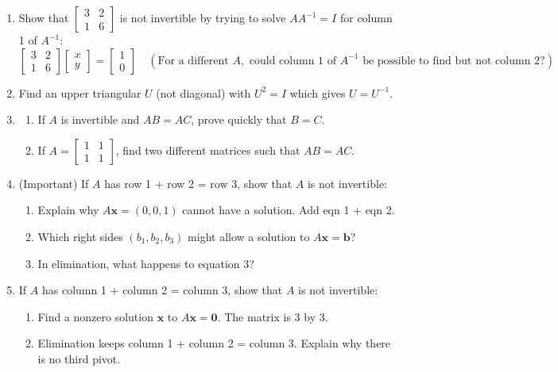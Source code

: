 \documentclass[14pt, a4paper]{article}
\begin{document}
\begin{enumerate}
    \item Show that $\begin{bmatrix} 3 & 2 \\ 1 & 6 \end{bmatrix}$ is not invertible by trying to solve $AA^{-1} = I$ for column 1 of $A^{-1}$:
          \[
              \begin{bmatrix} 3 & 2 \\ 1 & 6 \end{bmatrix}
              \begin{bmatrix} x \\ y \end{bmatrix}
              = \begin{bmatrix} 1 \\ 0 \end{bmatrix}
              \quad
              \left(\text{For a different } A,\text{ could column 1 of }A^{-1}\text{ be possible to find but not column 2?}\right)
          \]

    \item Find an upper triangular $U$ (not diagonal) with $U^2 = I$ which gives $U = U^{-1}$.

    \item
          \begin{enumerate}
              \item If $A$ is invertible and $AB = AC$, prove quickly that $B = C$.
              \item If $A = \begin{bmatrix} 1 & 1 \\ 1 & 1 \end{bmatrix}$, find two different matrices such that $AB = AC$.
          \end{enumerate}

    \item (Important) If $A$ has row 1 + row 2 = row 3, show that $A$ is not invertible:
          \begin{enumerate}
              \item Explain why $A\boldsymbol{x} = (0,0,1)$ cannot have a solution. Add eqn 1 + eqn 2.
              \item Which right sides $(b_1,b_2,b_3)$ might allow a solution to $A\boldsymbol{x} = \boldsymbol{b}$?
              \item In elimination, what happens to equation 3?
          \end{enumerate}

    \item If $A$ has column 1 + column 2 = column 3, show that $A$ is not invertible:
          \begin{enumerate}
              \item Find a nonzero solution $\boldsymbol{x}$ to $A\boldsymbol{x} = \boldsymbol{0}$. The matrix is 3 by 3.
              \item Elimination keeps column 1 + column 2 = column 3. Explain why there is no third pivot.
          \end{enumerate}


\end{enumerate}
\end{document}
